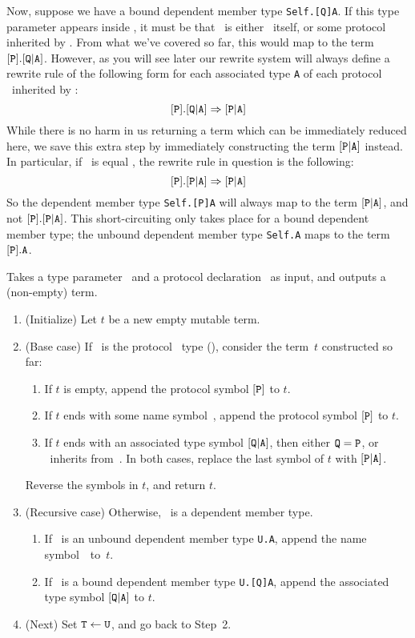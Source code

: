 \documentclass[../generics]{subfiles}
\begin{document}
%
Now, suppose we have a bound dependent member type \texttt{Self.[Q]A}. If this type parameter appears inside \tP, it must be that \tQ\ is either \tP\ itself, or some protocol inherited by \tP. From what we've covered so far, this would map to the term $[\texttt{P}].[\texttt{Q}|\texttt{A}]$. However, as you will see later our rewrite system will always define a rewrite rule of the following form for each associated type \texttt{A} of each protocol \tQ\ inherited by \tP:
\[[\texttt{P}].[\texttt{Q}|\texttt{A}]\Rightarrow [\texttt{P}|\texttt{A}]\]
While there is no harm in us returning a term which can be immediately reduced here, we save this extra step by immediately constructing the term $[\texttt{P}|\texttt{A}]$ instead. In particular, if \tQ\ is equal \tP, the rewrite rule in question is the following:
\[[\texttt{P}].[\texttt{P}|\texttt{A}]\Rightarrow [\texttt{P}|\texttt{A}]\]
So the dependent member type \texttt{Self.[P]A} will always map to the term $[\texttt{P}|\texttt{A}]$, and not $[\texttt{P}].[\texttt{P}|\texttt{A}]$. This short-circuiting only takes place for a bound dependent member type; the unbound dependent member type \texttt{Self.A} maps to the term $[\texttt{P}].\texttt{A}$.

\begin{algorithm}\label{build term protocol}
Takes a type parameter \tT\ and a protocol declaration \tP\ as input, and outputs a (non-empty) term.
\begin{enumerate}
\item (Initialize) Let $t$ be a new empty mutable term.
\item (Base case) If \tT\ is the protocol \tSelf\ type (), consider the term~$t$ constructed so far:
\begin{enumerate}
\item If $t$ is empty, append the protocol symbol $[\texttt{P}]$ to $t$.
\item If $t$ ends with some name symbol~\nA, append the protocol symbol $[\texttt{P}]$ to $t$.
\item If $t$ ends with an associated type symbol $[\texttt{Q}|\texttt{A}]$, then either $\texttt{Q}=\texttt{P}$, or \tP\ inherits from~\tQ. In both cases, replace the last symbol of $t$ with $[\texttt{P}|\texttt{A}]$.
\end{enumerate}
Reverse the symbols in $t$, and return $t$.
\item (Recursive case) Otherwise, \tT\ is a dependent member type.
\begin{enumerate}
\item If \tT\ is an unbound dependent member type \verb|U.A|, append the name symbol~\nA\ to~$t$.
\item If \tT\ is a bound dependent member type \verb|U.[Q]A|, append the associated type symbol $[\texttt{Q}|\texttt{A}]$ to $t$.
\end{enumerate}
\item (Next) Set $\texttt{T} \leftarrow \texttt{U}$, and go back to Step~2.
\end{enumerate}
\end{algorithm}
\end{document}
